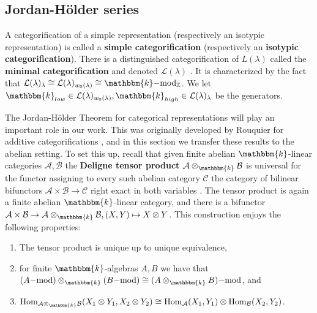 \documentclass[11pt,reqno]{amsart}
\numberwithin{equation}{section}
\theoremstyle{definition}
\theoremstyle{named}
\newcommand{\cA}{\mathcal{A}}
\newcommand{\cB}{\mathcal{B}}
\newcommand{\cC}{\mathcal{C}}
\newcommand{\cL}{\mathcal{L}}
\newcommand{\fg}{\mathfrak{g}}
\newcommand{\kk}{\mathbbm{k}}
\newcommand{\ZZ}{\mathbb{Z}}
\newcommand{\mmod}{\mathrm{-mod}}
\newcommand{\Hom}{\operatorname{Hom}}
\begin{document}
\subsection{Jordan-H\"older series}
A categorification of a simple representation (respectively an isotypic representation)  is called  a \textbf{simple categorification} (respectively an \textbf{isotypic categorification}).
There is a  distinguished  categorification of $L(\lambda)$ called the \textbf{minimal categorification} and denoted $\cL(\lambda)$ \cite{CR,Rou2KM,KLI,Webmerged,KK}. It  is characterized by the fact that $\cL(\lambda)_{\lambda}\cong \cL(\lambda)_{w_0(\lambda)} \cong \kk\mmod_{\ZZ}$.  We let $\kk_{low} \in \cL(\lambda)_{w_0(\lambda)}, \kk_{high}\in \cL(\lambda)_{\lambda}$ be the generators.  

%

The Jordan-H\"older Theorem for categorical representations will play an important role in our work.  
This was originally developed by Rouquier for additive categorifications \cite{Rou2KM}, and in this section we transfer these results to the abelian setting.
To set this up, recall that given finite abelian $\kk$-linear categories $\cA,\cB$ the \textbf{Deligne tensor product} $\cA \otimes_\kk \cB$  is universal for the functor assigning to every such abelian category $\cC$ the category of bilinear bifunctors $\cA \times \cB \to \cC$ right exact in both variables \cite[Definition 1.11.1]{EGNO}.  The tensor product is again a finite abelian $\kk$-linear category, and there is a bifunctor $\cA \times \cB \to \cA \otimes_\kk \cB, (X,Y) \mapsto X\otimes Y$.  This construction enjoys the following properties: 
\begin{enumerate}
\item The tensor product is unique up to unique equivalence,
\item for finite $\kk$-algebras $A,B$ we have that $(A\mmod)\otimes_\kk (B\mmod) \cong (A\otimes_\kk B)\mmod$, and
\item $\Hom_{\cA \otimes_\kk \cB}(X_1\otimes Y_1, X_2\otimes Y_2) \cong \Hom_\cA(X_1,Y_1)\otimes\Hom_\cB(X_2,Y_2)$.
\end{enumerate}
\end{document}

